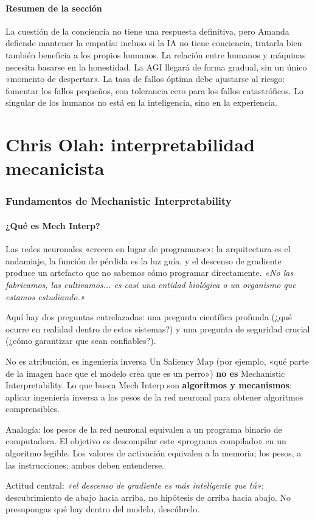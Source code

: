 \documentclass[a4paper]{article}
\begin{document}
\subsection{Resumen de la sección}

La cuestión de la conciencia no tiene una respuesta definitiva, pero Amanda defiende mantener la empatía: incluso si la IA no tiene conciencia, tratarla bien también beneficia a los propios humanos. La relación entre humanos y máquinas necesita basarse en la honestidad. La AGI llegará de forma gradual, sin un único «momento de despertar». La tasa de fallos óptima debe ajustarse al riesgo: fomentar los fallos pequeños, con tolerancia cero para los fallos catastróficos. Lo singular de los humanos no está en la inteligencia, sino en la experiencia.

\part{Chris Olah: interpretabilidad mecanicista}

\section{Fundamentos de Mechanistic Interpretability}

\subsection{¿Qué es Mech Interp?}

Las redes neuronales «crecen en lugar de programarse»: la arquitectura es el andamiaje, la función de pérdida es la luz guía, y el descenso de gradiente produce un artefacto que no sabemos cómo programar directamente. \textit{«No las fabricamos, las cultivamos... es casi una entidad biológica o un organismo que estamos estudiando.»}

Aquí hay dos preguntas entrelazadas: una pregunta científica profunda (¿qué ocurre en realidad dentro de estos sistemas?) y una pregunta de seguridad crucial (¿cómo garantizar que sean confiables?).

\begin{importantbox}{No es atribución, es ingeniería inversa}
Un Saliency Map (por ejemplo, «qué parte de la imagen hace que el modelo crea que es un perro») \textbf{no es} Mechanistic Interpretability. Lo que busca Mech Interp son \textbf{algoritmos y mecanismos}: aplicar ingeniería inversa a los pesos de la red neuronal para obtener algoritmos comprensibles.

Analogía: los pesos de la red neuronal equivalen a un programa binario de computadora. El objetivo es descompilar este «programa compilado» en un algoritmo legible. Los valores de activación equivalen a la memoria; los pesos, a las instrucciones; ambos deben entenderse.

Actitud central: \textit{«el descenso de gradiente es más inteligente que tú»}: descubrimiento de abajo hacia arriba, no hipótesis de arriba hacia abajo. No presupongas qué hay dentro del modelo, descúbrelo.
\end{importantbox}
\end{document}

